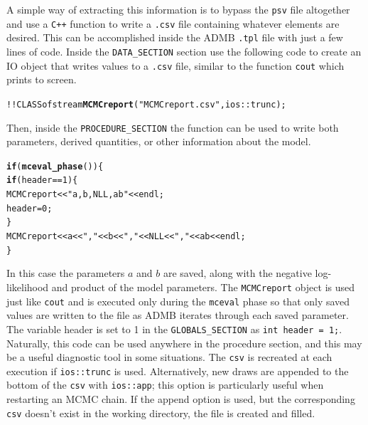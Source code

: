 \documentclass{article}\usepackage[]{graphicx}\usepackage[]{color}
\makeatletter
\newcommand{\hlstr}[1]{\textcolor[rgb]{0.192,0.494,0.8}{#1}}%
\newcommand{\hlkwd}[1]{\textcolor[rgb]{0.737,0.353,0.396}{\textbf{#1}}}%
\newenvironment{kframe}{%
 \def\at@end@of@kframe{}%
 \ifinner\ifhmode%
  \def\at@end@of@kframe{\end{minipage}}%
  \begin{minipage}{\columnwidth}%
 \fi\fi%
 \def\FrameCommand##1{\hskip\@totalleftmargin \hskip-\fboxsep
 \colorbox{shadecolor}{##1}\hskip-\fboxsep
     \hskip-\linewidth \hskip-\@totalleftmargin \hskip\columnwidth}%
 \MakeFramed {\advance\hsize-\width
   \@totalleftmargin\z@ \linewidth\hsize
   \@setminipage}}%
 {\par\unskip\endMakeFramed%
 \at@end@of@kframe}
\newenvironment{knitrout}{}{} %
\makeatother
\begin{document}
A simple way of extracting this information is to bypass the
\texttt{psv} file altogether and use a \texttt{C++} function
to write a \texttt{.csv} file containing whatever elements
are desired. This can be accomplished inside the ADMB
\texttt{.tpl} file with just a few lines of code. Inside the
\texttt{DATA\_SECTION} section use the following code to
create an IO object that writes values to a \texttt{.csv}
file, similar to the function \texttt{cout} which prints to
screen.
\begin{knitrout}
\color{fgcolor}\begin{kframe}
\begin{alltt}
  !!CLASS ofstream \hlkwd{MCMCreport}(\hlstr{"MCMCreport.csv"},ios::trunc);
\end{alltt}
\end{kframe}
\end{knitrout}
Then, inside the \texttt{PROCEDURE\_SECTION} the function
can be used to write both parameters, derived quantities, or
other information about the model.
\begin{knitrout}
\color{fgcolor}\begin{kframe}
\begin{alltt}
  \hlkwd{if}(\hlkwd{mceval_phase}())\{
    \hlkwd{if}(header==1) \{
        MCMCreport << \hlstr{"a,b,NLL,ab"} << endl;
        header=0;
    \}
    MCMCreport << a <<\hlstr{","} << b << \hlstr{","} << NLL << \hlstr{","} << ab << endl;
  \}
\end{alltt}
\end{kframe}
\end{knitrout}

In this case the parameters $a$ and $b$ are saved, along with the negative
log-likelihood and product of the model parameters.  The
\texttt{MCMCreport} object is used just like \texttt{cout} and is executed
only during the \texttt{mceval} phase so that only saved values are written
to the file as ADMB iterates through each saved parameter. The variable
header is set to 1 in the \texttt{GLOBALS\_SECTION} as \texttt{int header =
  1;}. Naturally, this code can be used anywhere in the procedure section,
and this may be a useful diagnostic tool in some situations. The \texttt{csv} 
is recreated at each execution if \texttt{ios::trunc} is used. Alternatively, 
new draws are appended to the bottom of the \texttt{csv} with \texttt{ios::app}; 
this option is particularly useful when restarting an MCMC chain. If the append 
option is used, but the corresponding \texttt{csv} doesn't exist in the working 
directory, the file is created and filled.
\end{document}

